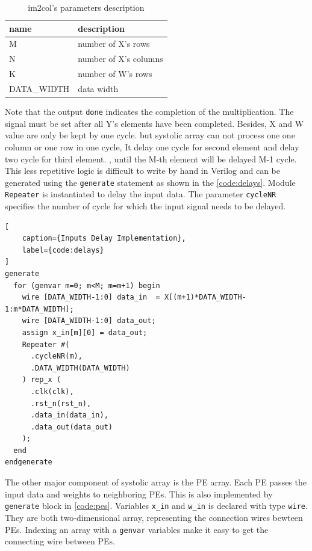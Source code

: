 \documentclass[conference]{IEEEtran}
\begin{document}
\begin{table}[ht]
  \caption{im2col's parameters description}
  \centering
  \begin{tabular}{|l|l|}
    \hline
    \textbf{name} & \textbf{description}  \\ \hline
    M             & number of X's rows    \\ \hline
    N             & number of X's columns \\ \hline
    K             & number of W's rows    \\ \hline
    DATA\_WIDTH   & data width            \\ \hline
  \end{tabular}
  \label{tab:syst_pa}
\end{table}

Note that the output \verb|done| indicates the completion of the multiplication.
The signal must be set after all Y's elements have been completed.
Besides, X and W value are only be kept by one cycle.
but systolic array can not process one one column or one row in one cycle,
It delay one cycle for second element and delay two cycle for third element.
, until the M-th element will be delayed M-1 cycle.
This less repetitive logic is difficult to write by hand in Verilog
and can be generated using the \verb|generate| statement as shown in the \ref{code:delays}.
Module \verb|Repeater| is instantiated to delay the input data.
The parameter \verb|cycleNR| specifies the number of cycle
for which the input signal needs to be delayed.

\begin{lstlisting}[
    caption={Inputs Delay Implementation},
    label={code:delays}
]
generate
  for (genvar m=0; m<M; m=m+1) begin
    wire [DATA_WIDTH-1:0] data_in  = X[(m+1)*DATA_WIDTH-1:m*DATA_WIDTH];
    wire [DATA_WIDTH-1:0] data_out;
    assign x_in[m][0] = data_out;
    Repeater #(
      .cycleNR(m),
      .DATA_WIDTH(DATA_WIDTH)
    ) rep_x (
      .clk(clk),
      .rst_n(rst_n),
      .data_in(data_in),
      .data_out(data_out)
    );
  end
endgenerate
\end{lstlisting}

The other major component of systolic array is the PE array.
Each PE passes the input data and weights to neighboring PEs.
This is also implemented by \verb|generate| block in \ref{code:pes}.
Variables \verb|x_in| and \verb|w_in| is declared with type \verb|wire|.
They are both two-dimensional array,
representing the connection wires bewteen PEs.
Indexing an array with a \verb|genvar| variables make it easy
to get the connecting wire between PEs.
\end{document}
